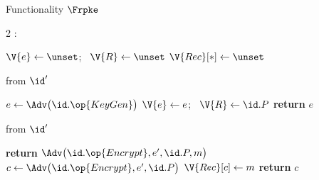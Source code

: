 \begin{interface}[nofloat]{Functionality $\Frpke$ \\
}

{\scriptsize
\setlength{\columnsep}{1.4em}
\begin{multicols}{2}
:
\begin{algorithmic}[1]
\setcounter{contline}{0}\algcont
\State $\V{e} \gets \unset$; \ $\V{R} \gets \unset$
\State $\V{Rec}[*] \gets \unset$
\algsave
\end{algorithmic}
\vspace{1.4ex}

 \quad from $\id'$
\begin{algorithmic}[1]
\algcont
\State $e \gets \Adv\bigl(\id.\op{KeyGen}\bigr)$ \label{ln:rpkeadvkey}
  \State $\V{e} \gets e$; \ $\V{R} \gets \id.P$ \label{ln:rpkefirst}
\EndIf
\State \textbf{return} $e$
\algsave
\end{algorithmic}
\vspace{1.4ex}

 \quad from $\id'$
\begin{algorithmic}[1]
\algcont
{} \label{ln:rpkedomain}
 \label{ln:rpkewrongkey}
  \State \textbf{return} $\Adv\bigl(\id.\op{Encrypt}, e', \id.P, m\bigr)$ \label{ln:rpkegiveup}
\EndIf
\State $c \gets \Adv\bigl(\id.\op{Encrypt}, e', \id.P\bigr)$ \label{ln:rpkehide}
 \label{ln:rpkeunique}
\State $\V{Rec}[c] \gets m$
\State \textbf{return} $c$
\algsave
\end{algorithmic}
\vspace{1.4ex}

\columnbreak


\end{multicols}}
\end{interface}
